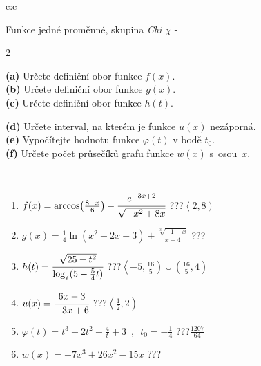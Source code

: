 \documentclass[10pt]{report}
\begin{document}
\begin{tabular}{c:c}
\begin{minipage}[c][104.5mm][t]{0.5\linewidth}
\begin{center}
\vspace{7mm}
{\huge Funkce jedné proměnné, skupina \textit{Chi $\chi$} -}\\[5mm]
\begin{minipage}{0.95\linewidth}
\begin{center}
{\small \begin{multicols}{2} \raggedright
\textbf{(a)} Určete definiční obor funkce \(f(x)\). \\[1mm]
\textbf{(b)} Určete definiční obor funkce \(g(x)\). \\[1mm]
\textbf{(c)} Určete definiční obor funkce \(h(t)\). \par \columnbreak
\textbf{(d)} Určete interval, na kterém je funkce \(u(x)\) nezáporná. \\[1mm]
\textbf{(e)} Vypočítejte hodnotu funkce \(\varphi(t)\) v bodě \(t_0\). \\[1mm]
\textbf{(f)} Určete počet průsečíků grafu funkce \(w(x)\) s~osou~\(x\). \\[1mm]
\end{multicols}
}
\end{center}
\end{minipage}
\\[4mm]
\begin{minipage}{0.79\linewidth}
\begin{center}
\begin{varwidth}{\linewidth}
\begin{enumerate}
\small
\item $f(x) = \arccos\!\left( \frac{8-x}{6} \right) - \cfrac{e^{-3x+2}}{\sqrt{-x^2+8x}}$\quad \dotfill\; ???\;\dotfill \quad $\left\langle2 , 8\right)$
\item $g(x) = \frac{1}{4} \ln{\!(x^2-2x-3)}+\frac{\sqrt[3]{-1-x}}{x-4}$\quad \dotfill\; ???\;\dotfill {}
\item $h(t) = \cfrac{\sqrt{25-t^2}}{\log_7(5-\frac{5}{4}t)}$\quad \dotfill\; ???\;\dotfill \quad $\left\langle-5 , \frac{16}{5}\right)\cup\left(\frac{16}{5} , 4\right)$
\item $u(x) = \cfrac{6x-3}{-3x+6}$\quad \dotfill\; ???\;\dotfill \quad $\left\langle\frac{1}{2} , 2\right)$
\item $\varphi(t) = t^3-2t^2-\frac{4}{t}+3 \enspace , \enspace t_0=-\frac{1}{4}$\quad \dotfill\; ???\;\dotfill \quad $\frac{1207}{64}$
\item $w(x) = -7x^3+26x^2-15x$\quad \dotfill\; ???\;\dotfill {}

\end{enumerate}
\end{varwidth}
\end{center}
\end{minipage}
\end{center}
\end{minipage}
\end{tabular}
\end{document}
